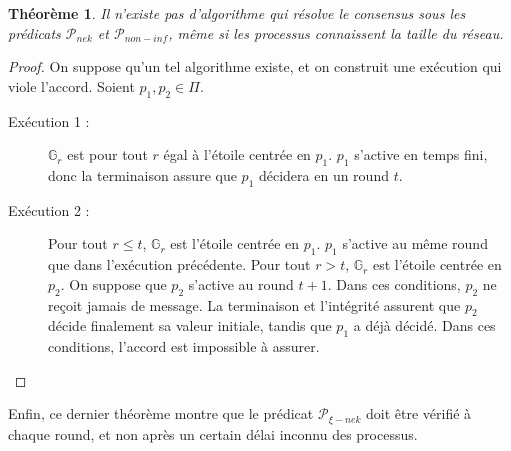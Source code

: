 \documentclass{article}
\newtheorem{theorem}{Théorème}
\begin{document}
\begin{theorem}
	Il n'existe pas d'algorithme qui résolve le consensus sous les prédicats $\mathcal{P}_{nek}$ et $\mathcal{P}_{non-inf}$, même si les processus connaissent la taille du réseau.
\end{theorem}
\begin{proof}
	On suppose qu'un tel algorithme existe, et on construit une exécution qui viole l'accord.
	Soient $p_1, p_2 \in \Pi$.
	\begin{description}

		\item[Exécution 1 :] $\mathds{G}_r$ est pour tout $r$ égal à l'étoile centrée en $p_1$. $p_1$ s'active en temps fini, donc la terminaison assure que $p_1$ décidera en un round $t$.
		\item[Exécution 2 :] Pour tout $r \leq t$, $\mathds{G}_r$ est l'étoile centrée en $p_1$. $p_1$ s'active au même round que dans l'exécution précédente.
			Pour tout $r > t$, $\mathds{G}_r$ est l'étoile centrée en $p_2$. On suppose que $p_2$ s'active au round $t+1$.
			Dans ces conditions, $p_2$ ne reçoit jamais de message. La terminaison et l'intégrité assurent que $p_2$ décide finalement sa valeur initiale,
			tandis que $p_1$ a déjà décidé. Dans ces conditions, l'accord est impossible à assurer.

	\end{description}
\end{proof}

Enfin, ce dernier théorème montre que le prédicat $\mathcal{P}_{\xi-nek}$ doit être vérifié à chaque round, et non après un certain délai inconnu des processus.
\end{document}
